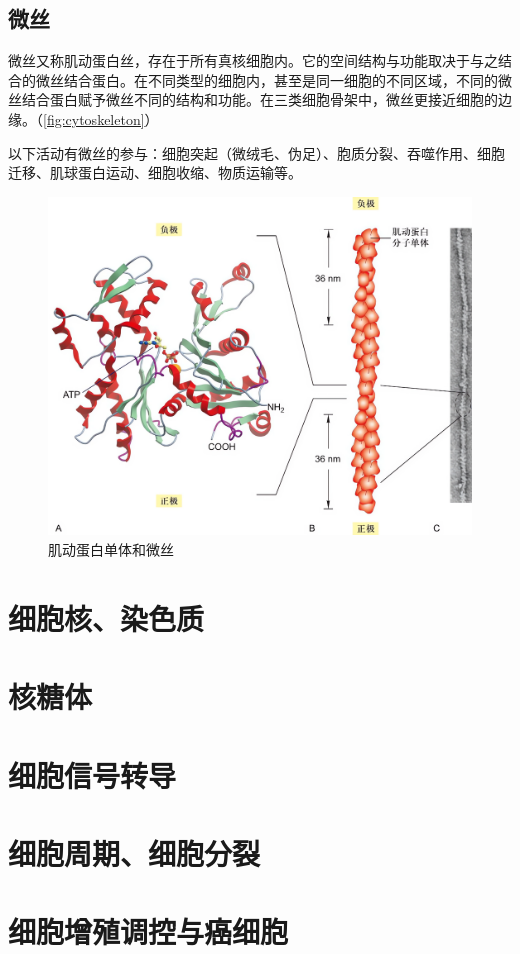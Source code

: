 \subsection{微丝}

微丝又称肌动蛋白丝，存在于所有真核细胞内。它的空间结构与功能取决于与之结合的微丝结合蛋白。在不同类型的细胞内，甚至是同一细胞的不同区域，不同的微丝结合蛋白赋予微丝不同的结构和功能。在三类细胞骨架中，微丝更接近细胞的边缘。（\autoref{fig:cytoskeleton}）

以下活动有微丝的参与：细胞突起（微绒毛、伪足）、胞质分裂、吞噬作用、细胞迁移、肌球蛋白运动、细胞收缩、物质运输等。

\begin{figure}
	\centering
	\includegraphics[width=0.7\linewidth]{Pics/肌动蛋白和微丝}
	\caption{肌动蛋白单体和微丝}
	\label{fig:actin_microfibre}
\end{figure}


\section{细胞核、染色质}

\section{核糖体}

\section{细胞信号转导}

\section{细胞周期、细胞分裂}

\section{细胞增殖调控与癌细胞}






